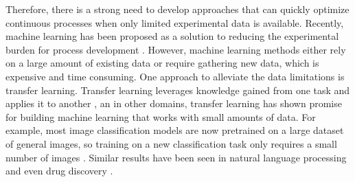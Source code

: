 

Therefore, there is a strong need to develop approaches that can quickly optimize continuous processes when only limited experimental data is available. Recently, machine learning has been proposed as a solution to reducing the experimental burden for process development \cite{Taylor2023a}.  However, machine learning methods either rely on a large amount of existing data or require gathering new data, which is expensive and time consuming.  One approach to alleviate the data limitations is transfer learning. Transfer learning leverages knowledge gained from one task and applies it to another \cite{Zhuang2021}, an in other domains, transfer learning has shown promise for building machine learning that works with small amounts of data. For example, most image classification models are now pretrained on a large dataset of general images, so training on a new classification task only requires a small number of images \cite{He2016}. Similar results have been seen in natural language processing \cite{Brown2020} and even drug discovery \cite{Ramsundar2017}. 


